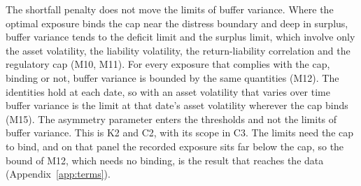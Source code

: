 The shortfall penalty does not move the limits of buffer variance. Where the optimal
exposure binds the cap near the distress boundary and deep in surplus, buffer
variance tends to the deficit limit and the surplus limit, which involve only
the asset volatility, the liability volatility, the return-liability
correlation and the regulatory cap (M10, M11). For every exposure that
complies with the cap, binding or not, buffer variance is bounded by the same
quantities (M12). The identities hold at each date, so with an asset
volatility that varies over time buffer variance is the limit at that date's
asset volatility wherever the cap binds (M15). The asymmetry parameter enters
the thresholds and not the limits of buffer variance. This is K2 and C2, with its scope in C3. The
limits need the cap to bind, and on that panel the recorded exposure sits far
below the cap, so the bound of M12, which needs no binding, is the result that
reaches the data (Appendix~\ref{app:terms}).


